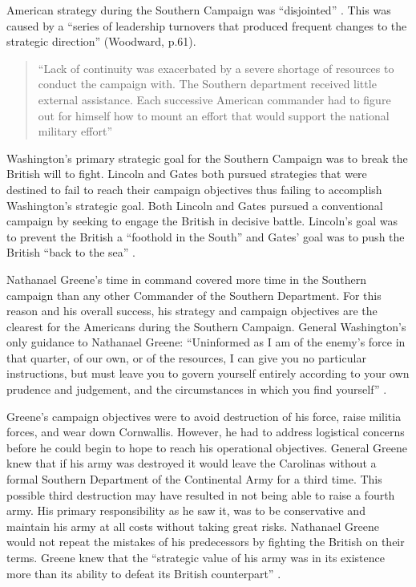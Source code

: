American strategy during the Southern Campaign was “disjointed”
\cite[p.60]{woodward_comparative_2002}. This was caused by a “series of leadership turnovers that
produced frequent changes to the strategic direction” (Woodward, p.61).  

\begin{quote} “Lack of continuity was exacerbated by a severe shortage of
  resources to conduct the campaign with.  The Southern department received
  little external assistance.  Each successive American commander had to figure
  out for himself how to mount an effort that would support the national
  military effort” \cite[p.61]{woodward_comparative_2002} \end{quote}

Washington's primary strategic goal for the Southern Campaign was to break the
British will to fight.  Lincoln and Gates both pursued strategies that were
destined to fail to reach their campaign objectives thus failing to accomplish
Washington’s strategic goal.  Both Lincoln and Gates pursued a conventional
campaign by seeking to engage the British in decisive battle.  Lincoln’s goal
was to prevent the British a “foothold in the South” and Gates’ goal was to push
the British “back to the sea” \cite[p.64]{woodward_comparative_2002}. 

Nathanael Greene’s time in command covered more time in the Southern campaign
than any other Commander of the Southern Department.  For this reason and his
overall success, his strategy and campaign objectives are the clearest for the
Americans during the Southern Campaign.  General Washington’s only guidance to
Nathanael Greene:  “Uninformed as I am of the enemy’s force in that quarter, of
our own, or of the resources, I can give you no particular instructions, but
must leave you to govern yourself entirely according to your own prudence and
judgement, and the circumstances in which you find yourself”
\cite[p.63]{woodward_comparative_2002}.

Greene’s campaign objectives were to avoid destruction of his force, raise
militia forces, and wear down Cornwallis.  However, he had to address logistical
concerns before he could begin to hope to reach his operational objectives.
General Greene knew that if his army was destroyed it would leave the Carolinas
without a formal Southern Department of the Continental Army for a third time.
This possible third destruction may have resulted in not being able to raise a
fourth army.  His primary responsibility as he saw it, was to be conservative
and maintain his army at all costs without taking great risks. Nathanael Greene
would not repeat the mistakes of his predecessors by fighting the British on
their terms.   Greene knew that the “strategic value of his army was in its
existence more than its ability to defeat its British counterpart”
\cite[p.66]{woodward_comparative_2002}.


